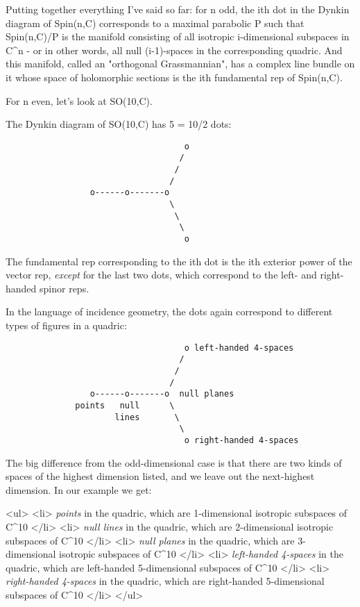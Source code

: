 Putting together everything I've said so far: for n odd, the ith dot in
the Dynkin diagram of Spin(n,C) corresponds to a maximal parabolic P
such that Spin(n,C)/P is the manifold consisting of all isotropic
i-dimensional subspaces in C^{n} - or in other words, 
all null (i-1)-spaces in the corresponding quadric.  And this manifold, 
called an "orthogonal Grassmannian", has a complex line 
bundle on it whose space of holomorphic sections is the ith fundamental 
rep of Spin(n,C).

For n even, let's look at SO(10,C).

The Dynkin diagram of SO(10,C) has 5 = 10/2 dots:
   
\begin{verbatim}
                                    o 
                                   /
                                  /
                                 /
                 o------o-------o 
                                 \
                                  \
                                   \
                                    o
\end{verbatim}
    
The fundamental rep corresponding to the ith dot is the 
ith exterior power of the vector rep, \emph{except} for the last 
two dots, which correspond to the left- and right-handed
spinor reps.

In the language of incidence geometry, the dots again 
correspond to different types of figures in a quadric:


\begin{verbatim}
                                    o left-handed 4-spaces
                                   /
                                  /
                                 /
                 o------o-------o  null planes
              points   null      \
                      lines       \
                                   \
                                    o right-handed 4-spaces 
\end{verbatim}
    
The big difference from the odd-dimensional case is that there are two
kinds of spaces of the highest dimension listed, and we leave out the
next-highest dimension.  In our example we get:

<ul>
<li>
\emph{points} in the quadric, which are 
1-dimensional isotropic subspaces of C^{10}
</li>
<li>
\emph{null lines} in the quadric, which are 
2-dimensional isotropic subspaces of C^{10}
</li>
<li>
\emph{null planes} in the quadric, which are 
3-dimensional isotropic subspaces of C^{10}
</li>
<li>
\emph{left-handed 4-spaces} in the quadric, which are 
left-handed 5-dimensional subspaces of C^{10}
</li>
<li>
\emph{right-handed 4-spaces} in the quadric, which are 
right-handed 5-dimensional subspaces of C^{10}
</li>
</ul>

